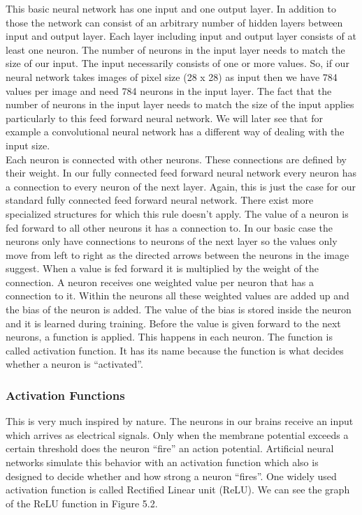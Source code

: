 \documentclass[a4paper,12pt]{report}
\begin{document}
	This basic neural network has one input and one output layer. In addition to those the network can consist of an arbitrary number of hidden layers between input and output layer. Each layer including input and output layer consists of at least one neuron. The number of neurons in the input layer needs to match the size of our input. The input necessarily consists of one or more values. So, if our neural network takes images of pixel size (28 x 28) as input then we have 784 values per image and need 784 neurons in the input layer. The fact that the number of neurons in the input layer needs to match the size of the input applies particularly to this feed forward neural network. We will later see that for example a convolutional neural network has a different way of dealing with the input size. \\
	
	Each neuron is connected with other neurons. These connections are defined by their weight. In our fully connected feed forward neural network every neuron has a connection to every neuron of the next layer. Again, this is just the case for our standard fully connected feed forward neural network. There exist more specialized structures for which this rule doesn’t apply. The value of a neuron is fed forward to all other neurons it has a connection to. In our basic case the neurons only have connections to neurons of the next layer so the values only move from left to right as the directed arrows between the neurons in the image suggest. When a value is fed forward it is multiplied by the weight of the connection. A neuron receives one weighted value per neuron that has a connection to it. Within the neurons all these weighted values are added up and the bias of the neuron is added. The value of the bias is stored inside the neuron and it is learned during training. Before the value is given forward to the next neurons, a function is applied. This happens in each neuron. The function is called activation function. It has its name because the function is what decides whether a neuron is “activated”.\\
	\subsubsection{Activation Functions}
	This is very much inspired by nature. The neurons in our brains receive an input which arrives as electrical signals. Only when the membrane potential exceeds a certain threshold does the neuron “fire” an action potential. Artificial neural networks simulate this behavior with an activation function which also is designed to decide whether and how strong a neuron “fires”. One widely used activation function is called Rectified Linear unit (ReLU). We can see the graph of the ReLU function in Figure 5.2.
	
\end{document}
